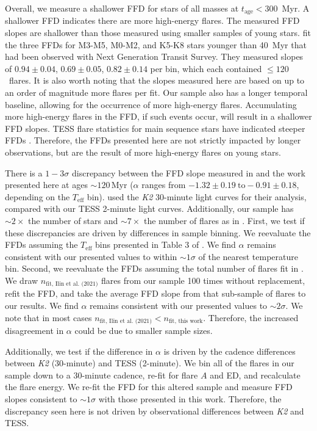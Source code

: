\documentclass[twocolumn, linenumbers]{aastex631}
\begin{document}
Overall, we measure a shallower FFD for stars of all masses at $t_\textrm{age} < 300$~Myr. A shallower FFD indicates there are more high-energy flares. The measured FFD slopes are shallower
than those measured using smaller samples of young stars. \cite{jackman21} fit the three FFDs for M3-M5, M0-M2, and K5-K8 stars younger than 40~Myr that had been observed with Next Generation
Transit Survey. They measured slopes of $0.94 \pm 0.04$, $0.69 \pm 0.05$, $0.82 \pm 0.14$ per bin, which each contained $\leq 120$~flares.  It is also worth noting that the slopes measured
here are based on up to an order of magnitude more flares per fit. Our sample also has a longer temporal baseline, allowing for the occurrence of more high-energy flares. Accumulating more
high-energy flares in the FFD, if such events occur, will result in a shallower FFD slopes. TESS flare statistics for main sequence stars have indicated steeper FFDs \citep{feinstein22_criticality}.
Therefore, the FFDs presented here are not strictly impacted by longer observations, but are the result of more high-energy flares on young stars.


There is a $1-3\sigma$ discrepancy between the FFD slope measured in \cite{ilin21} and the work presented here at ages $\sim 120$\,Myr ($\alpha$ ranges from
$-1.32 \pm 0.19 ~\textrm{to} -0.91 \pm 0.18$, depending on the $T_\textrm{eff}$ bin). \cite{ilin21} used the \textit{K2} 30-minute light curves for their analysis, compared with our TESS
2-minute light curves. Additionally, our sample has $\sim 2 \times$ the number of stars and $\sim 7 \times$ the number of flares as in \cite{ilin21}. First, we test if these discrepancies
are driven by differences in sample binning. We reevaluate the FFDs assuming the $T_\textrm{eff}$ bins presented in Table 3 of \cite{ilin21}. We find $\alpha$ remains consistent with our
presented values to within $\sim 1\sigma$ of the nearest temperature bin. Second, we reevaluate the FFDs assuming the total number of flares fit in \cite{ilin21}. We
draw $n_\textrm{fit, Ilin et al. (2021)}$ \citep[last column in Table 3 of ][]{ilin21} flares from our sample 100 times without replacement, refit the FFD, and take the average FFD slope
from that sub-sample of flares to our results.  We find $\alpha$ remains consistent with our presented values to $\sim 2\sigma$. We note that in most cases
$n_\textrm{fit, Ilin et al. (2021)} < n_\textrm{fit, this work}$. Therefore, the increased disagreement in $\alpha$ could be due to smaller sample sizes.

Additionally, we test if the difference in $\alpha$ is driven by the cadence differences between \textit{K2} (30-minute) and TESS (2-minute). We bin all of the flares in our sample down
to a 30-minute cadence, re-fit for flare $A$ and ED, and recalculate the flare energy. We re-fit the FFD for this altered sample and measure  FFD slopes consistent to $\sim 1 \sigma$ with
those presented in this work. Therefore, the discrepancy seen here is not driven by observational differences between \textit{K2} and TESS.
\end{document}
